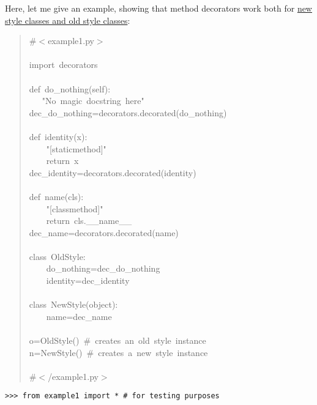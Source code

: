 \documentclass[11pt,english]{article}
\begin{document}
Here, let me give an example, showing that method decorators work both for 
\href{http://www.python.org/2.3/descrintro.html}{new style classes and old style classes}:
\begin{quote}
\begin{ttfamily}\begin{flushleft}
\mbox{{\#}{$<$}example1.py{$>$}}\\
\mbox{}\\
\mbox{import~decorators}\\
\mbox{}\\
\mbox{def~do{\_}nothing(self):}\\
\mbox{~~~"No~magic~docstring~here"}\\
\mbox{dec{\_}do{\_}nothing=decorators.decorated(do{\_}nothing)}\\
\mbox{}\\
\mbox{def~identity(x):}\\
\mbox{~~~~"[staticmethod]"}\\
\mbox{~~~~return~x}\\
\mbox{dec{\_}identity=decorators.decorated(identity)~}\\
\mbox{}\\
\mbox{def~name(cls):}\\
\mbox{~~~~"[classmethod]"}\\
\mbox{~~~~return~cls.{\_}{\_}name{\_}{\_}}\\
\mbox{dec{\_}name=decorators.decorated(name)}\\
\mbox{}\\
\mbox{class~OldStyle:}\\
\mbox{~~~~do{\_}nothing=dec{\_}do{\_}nothing}\\
\mbox{~~~~identity=dec{\_}identity}\\
\mbox{}\\
\mbox{class~NewStyle(object):}\\
\mbox{~~~~name=dec{\_}name}\\
\mbox{}\\
\mbox{o=OldStyle()~{\#}~creates~an~old~style~instance}\\
\mbox{n=NewStyle()~{\#}~creates~a~new~style~instance}\\
\mbox{}\\
\mbox{{\#}{$<$}/example1.py{$>$}}
\end{flushleft}\end{ttfamily}
\end{quote}
\begin{verbatim}>>> from example1 import * # for testing purposes\end{verbatim}
\end{document}
